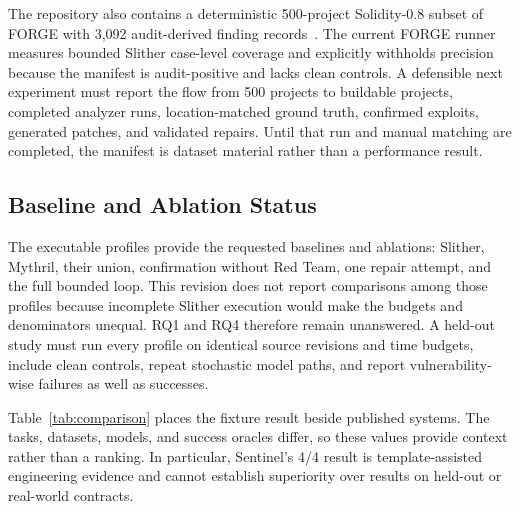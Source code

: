 \documentclass[conference,a4paper,10pt]{IEEEtran}
\begin{document}
The repository also contains a deterministic 500-project Solidity-0.8 subset of FORGE with 3,092 audit-derived finding records~\cite{forgeartifacts}. The current FORGE runner measures bounded Slither case-level coverage and explicitly withholds precision because the manifest is audit-positive and lacks clean controls. A defensible next experiment must report the flow from 500 projects to buildable projects, completed analyzer runs, location-matched ground truth, confirmed exploits, generated patches, and validated repairs. Until that run and manual matching are completed, the manifest is dataset material rather than a performance result.

\subsection{Baseline and Ablation Status}
The executable profiles provide the requested baselines and ablations: Slither, Mythril, their union, confirmation without Red Team, one repair attempt, and the full bounded loop. This revision does not report comparisons among those profiles because incomplete Slither execution would make the budgets and denominators unequal. RQ1 and RQ4 therefore remain unanswered. A held-out study must run every profile on identical source revisions and time budgets, include clean controls, repeat stochastic model paths, and report vulnerability-wise failures as well as successes.

Table~\ref{tab:comparison} places the fixture result beside published systems. The tasks, datasets, models, and success oracles differ, so these values provide context rather than a ranking. In particular, Sentinel's 4/4 result is template-assisted engineering evidence and cannot establish superiority over results on held-out or real-world contracts.
\end{document}
